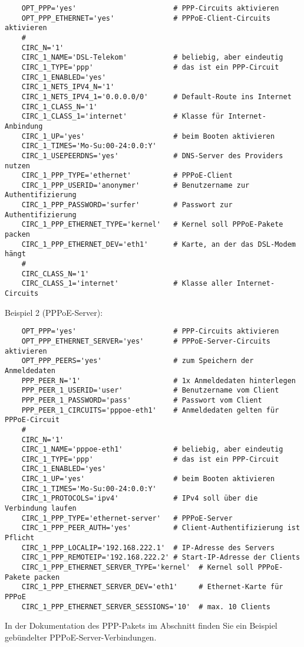 \begin{example}
\begin{verbatim}
    OPT_PPP='yes'                       # PPP-Circuits aktivieren
    OPT_PPP_ETHERNET='yes'              # PPPoE-Client-Circuits aktivieren
    #
    CIRC_N='1'
    CIRC_1_NAME='DSL-Telekom'           # beliebig, aber eindeutig
    CIRC_1_TYPE='ppp'                   # das ist ein PPP-Circuit
    CIRC_1_ENABLED='yes'
    CIRC_1_NETS_IPV4_N='1'
    CIRC_1_NETS_IPV4_1='0.0.0.0/0'      # Default-Route ins Internet
    CIRC_1_CLASS_N='1'
    CIRC_1_CLASS_1='internet'           # Klasse für Internet-Anbindung
    CIRC_1_UP='yes'                     # beim Booten aktivieren
    CIRC_1_TIMES='Mo-Su:00-24:0.0:Y'
    CIRC_1_USEPEERDNS='yes'             # DNS-Server des Providers nutzen
    CIRC_1_PPP_TYPE='ethernet'          # PPPoE-Client
    CIRC_1_PPP_USERID='anonymer'        # Benutzername zur Authentifizierung
    CIRC_1_PPP_PASSWORD='surfer'        # Passwort zur Authentifizierung
    CIRC_1_PPP_ETHERNET_TYPE='kernel'   # Kernel soll PPPoE-Pakete packen
    CIRC_1_PPP_ETHERNET_DEV='eth1'      # Karte, an der das DSL-Modem hängt
    #
    CIRC_CLASS_N='1'
    CIRC_CLASS_1='internet'             # Klasse aller Internet-Circuits
\end{verbatim}
\end{example}

\noindent
Beispiel 2 (PPPoE-Server):

\begin{example}
\begin{verbatim}
    OPT_PPP='yes'                       # PPP-Circuits aktivieren
    OPT_PPP_ETHERNET_SERVER='yes'       # PPPoE-Server-Circuits aktivieren
    OPT_PPP_PEERS='yes'                 # zum Speichern der Anmeldedaten
    PPP_PEER_N='1'                      # 1x Anmeldedaten hinterlegen
    PPP_PEER_1_USERID='user'            # Benutzername vom Client
    PPP_PEER_1_PASSWORD='pass'          # Passwort vom Client
    PPP_PEER_1_CIRCUITS='pppoe-eth1'    # Anmeldedaten gelten für PPPoE-Circuit
    #
    CIRC_N='1'
    CIRC_1_NAME='pppoe-eth1'            # beliebig, aber eindeutig
    CIRC_1_TYPE='ppp'                   # das ist ein PPP-Circuit
    CIRC_1_ENABLED='yes'
    CIRC_1_UP='yes'                     # beim Booten aktivieren
    CIRC_1_TIMES='Mo-Su:00-24:0.0:Y'
    CIRC_1_PROTOCOLS='ipv4'             # IPv4 soll über die Verbindung laufen
    CIRC_1_PPP_TYPE='ethernet-server'   # PPPoE-Server
    CIRC_1_PPP_PEER_AUTH='yes'          # Client-Authentifizierung ist Pflicht
    CIRC_1_PPP_LOCALIP='192.168.222.1'  # IP-Adresse des Servers
    CIRC_1_PPP_REMOTEIP='192.168.222.2' # Start-IP-Adresse der Clients
    CIRC_1_PPP_ETHERNET_SERVER_TYPE='kernel'  # Kernel soll PPPoE-Pakete packen
    CIRC_1_PPP_ETHERNET_SERVER_DEV='eth1'     # Ethernet-Karte für PPPoE
    CIRC_1_PPP_ETHERNET_SERVER_SESSIONS='10'  # max. 10 Clients
\end{verbatim}
\end{example}

In der Dokumentation des PPP-Pakets im Abschnitt
 finden Sie ein Beispiel gebündelter
PPPoE-Server-Verbindungen.
